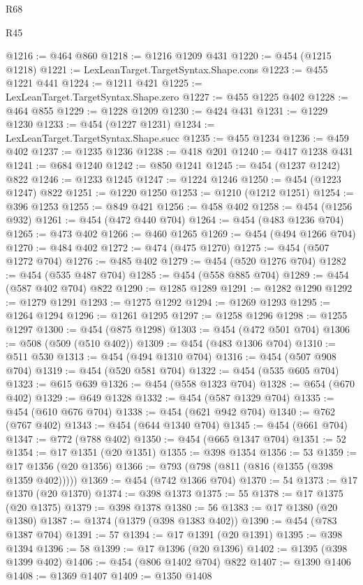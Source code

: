 \begin{lexlean}{R68}
\begin{lexlean}{R45}
\begin{coremodule}
{{{{{{{{{{{{{{{{{{{{{{{{{{{{{{{{{{{{{{{{{{{{{{{{{{{{{{{{{{{{{{{{{{{{{{{{{{{{{{{{{{{{{{{{{{{@1216 := @464 @860
@1218 := @1216 @1209 @431
@1220 := @454 (@1215 @1218)
@1221 := LexLeanTarget.TargetSyntax.Shape.cons
@1223 := @455 @1221 @441
@1224 := @1211 @421
@1225 := LexLeanTarget.TargetSyntax.Shape.zero
@1227 := @455 @1225 @402
@1228 := @464 @855
@1229 := @1228 @1209
@1230 := @424 @431
@1231 := @1229 @1230
@1233 := @454 (@1227 @1231)
@1234 := LexLeanTarget.TargetSyntax.Shape.succ
@1235 := @455 @1234
@1236 := @459 @402
@1237 := @1235 @1236
@1238 := @418 @201
@1240 := @417 @1238 @431
@1241 := @684 @1240
@1242 := @850 @1241
@1245 := @454 (@1237 @1242) @822
@1246 := @1233 @1245
@1247 := @1224 @1246
@1250 := @454 (@1223 @1247) @822
@1251 := @1220 @1250
@1253 := @1210 (@1212 @1251)
@1254 := @396 @1253
@1255 := @849 @421
@1256 := @458 @402
@1258 := @454 (@1256 @932)
@1261 := @454 (@472 @440 @704)
@1264 := @454 (@483 @1236 @704)
@1265 := @473 @402
@1266 := @460 @1265
@1269 := @454 (@494 @1266 @704)
@1270 := @484 @402
@1272 := @474 (@475 @1270)
@1275 := @454 (@507 @1272 @704)
@1276 := @485 @402
@1279 := @454 (@520 @1276 @704)
@1282 := @454 (@535 @487 @704)
@1285 := @454 (@558 @885 @704)
@1289 := @454 (@587 @402 @704) @822
@1290 := @1285 @1289
@1291 := @1282 @1290
@1292 := @1279 @1291
@1293 := @1275 @1292
@1294 := @1269 @1293
@1295 := @1264 @1294
@1296 := @1261 @1295
@1297 := @1258 @1296
@1298 := @1255 @1297
@1300 := @454 (@875 @1298)
@1303 := @454 (@472 @501 @704)
@1306 := @508 (@509 (@510 @402))
@1309 := @454 (@483 @1306 @704)
@1310 := @511 @530
@1313 := @454 (@494 @1310 @704)
@1316 := @454 (@507 @908 @704)
@1319 := @454 (@520 @581 @704)
@1322 := @454 (@535 @605 @704)
@1323 := @615 @639
@1326 := @454 (@558 @1323 @704)
@1328 := @654 (@670 @402)
@1329 := @649 @1328
@1332 := @454 (@587 @1329 @704)
@1335 := @454 (@610 @676 @704)
@1338 := @454 (@621 @942 @704)
@1340 := @762 (@767 @402)
@1343 := @454 (@644 @1340 @704)
@1345 := @454 (@661 @704)
@1347 := @772 (@788 @402)
@1350 := @454 (@665 @1347 @704)
@1351 := 52
@1354 := @17 @1351 (@20 @1351)
@1355 := @398 @1354
@1356 := 53
@1359 := @17 @1356 (@20 @1356)
@1366 := @793 (@798 (@811 (@816 (@1355 (@398 @1359 @402)))))
@1369 := @454 (@742 @1366 @704)
@1370 := 54
@1373 := @17 @1370 (@20 @1370)
@1374 := @398 @1373
@1375 := 55
@1378 := @17 @1375 (@20 @1375)
@1379 := @398 @1378
@1380 := 56
@1383 := @17 @1380 (@20 @1380)
@1387 := @1374 (@1379 (@398 @1383 @402))
@1390 := @454 (@783 @1387 @704)
@1391 := 57
@1394 := @17 @1391 (@20 @1391)
@1395 := @398 @1394
@1396 := 58
@1399 := @17 @1396 (@20 @1396)
@1402 := @1395 (@398 @1399 @402)
@1406 := @454 (@806 @1402 @704) @822
@1407 := @1390 @1406
@1408 := @1369 @1407
@1409 := @1350 @1408
}}}}}}}}}}}}}}}}}}}}}}}}}}}}}}}}}}}}}}}}}}}}}}}}}}}}}}}}}}}}}}}}}}}}}}}}}}}}}}}}}}}}}}}}}}}
\end{coremodule}
\end{lexlean}
\end{lexlean}
